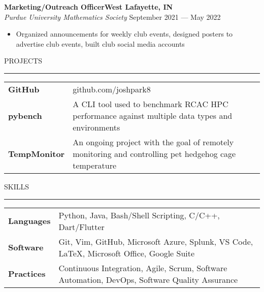 \documentclass[letter,11pt]{article}
\begin{document}
\textbf{Marketing/Outreach Officer\hfill West Lafayette, IN} \\
\emph{Purdue University Mathematics Society} \hfill September 2021 --- May 2022\\
\vspace*{-1.75em}
\begin{itemize}[label=-, leftmargin=*, labelwidth=1.5cm, align=left, noitemsep]
    \item Organized announcements for weekly club events, designed posters to advertise club events, built club social media accounts
\end{itemize}

PROJECTS

\vspace*{-1.25em}
\rule{\textwidth}{1.2pt}

\begin{tabular}{@{}p{2.25cm}l}
    \textbf{GitHub} &github.com/joshpark8 \\
    \textbf{pybench} &A CLI tool used to benchmark RCAC HPC performance against multiple data types and environments \\
    \textbf{TempMonitor} &An ongoing project with the goal of remotely monitoring and controlling pet hedgehog cage temperature
\end{tabular}

SKILLS

\vspace*{-1.25em}
\rule{\textwidth}{1.2pt}

\begin{tabular}{@{}p{2.25cm}l}
    \textbf{Languages} &Python, Java, Bash/Shell Scripting, C/C++, Dart/Flutter \\
    \textbf{Software} &Git, Vim, GitHub, Microsoft Azure, Splunk, VS Code, LaTeX, Microsoft Office, Google Suite \\
    \textbf{Practices} &Continuous Integration, Agile, Scrum, Software Automation, DevOps, Software Quality Assurance
\end{tabular}
\end{document}
